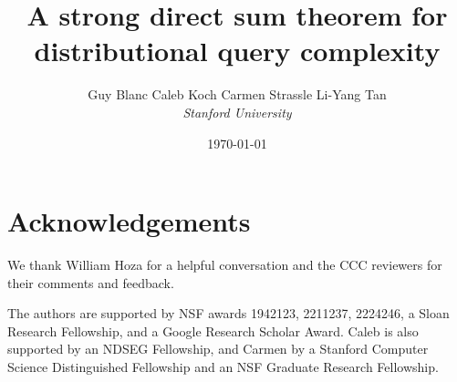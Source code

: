 \documentclass[11pt]{article}
\title{A strong direct sum theorem for distributional query complexity\vspace{10pt}}
\author{ 
Guy Blanc \qquad  
Caleb Koch  \qquad  
 Carmen Strassle  \qquad 
Li-Yang Tan \vspace{15pt} \\
{\sl Stanford University}
\vspace{5pt}
}
\date{\small{\today}}
\begin{document}
\maketitle




%





\section*{Acknowledgements}


We thank William Hoza for a helpful conversation and the CCC reviewers for their comments and feedback. 

The authors are supported by NSF awards 1942123, 2211237, 2224246, a Sloan Research Fellowship, and a Google Research Scholar Award. Caleb is also supported by an NDSEG Fellowship, and Carmen by a Stanford Computer Science Distinguished Fellowship and an NSF Graduate Research Fellowship.





\newpage 
\appendix

\end{document}
